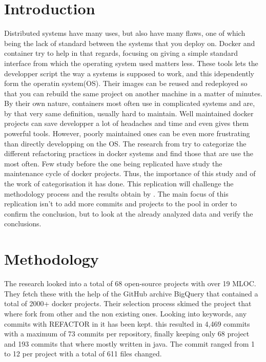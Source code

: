 \documentclass[lettersize,journal]{IEEEtran}
\begin{document}
\section{Introduction}
Distributed systems have many uses, but also have many flaws, one of which being the lack of standard between the systems that you deploy on.
Docker and container try to help in that regards, focusing on giving a simple standard interface from which the operating system used matters less.
These tools lets the developper script the way a systems is supposed to work, and this idependently form the operatin system(OS).
Their images can be reused and redeployed so that you can rebuild the same project on another machine in a matter of minutes.
By their own nature, containers most often use in complicated systems and are, by that very same definition, usually hard to maintain.
Well maintained docker projects can save developper a lot of headaches and time and even gives them powerful tools.
However, poorly maintained ones can be even more frustrating than directly developping on the OS.
The research from \cite{1} try to categorize the different refactoring practices in docker systems and find those that are use the most often.
Few study before the one being replicated have study the maintenance cycle of docker projects.
Thus, the importance of this study and of the work of categorisation it has done.
This replication will challenge the methodology process and the results obtain by \cite{1}.
The main focus of this replication isn't to add more commits and projects to the pool in order to confirm the conclusion, but to look at the already analyzed data and verify the conclusions. 

\section{Methodology}

The research looked into a total of 68 open-source projects with over 19 MLOC. 
They fetch these with the help of the GitHub archive BigQuery that contained a total of 2000+ docker projects.
Their selection process skimed the project that where fork from other and the non existing ones.
Looking into keywords, any commits with REFACTOR in it has been kept.
this resulted in 4,469 commits with a maximum of 73 commits per repository, finally keeping only 68 project and 193 commits that where mostly written in java.
The commit ranged from 1 to 12 per project with a total of 611 files changed.
\end{document}
